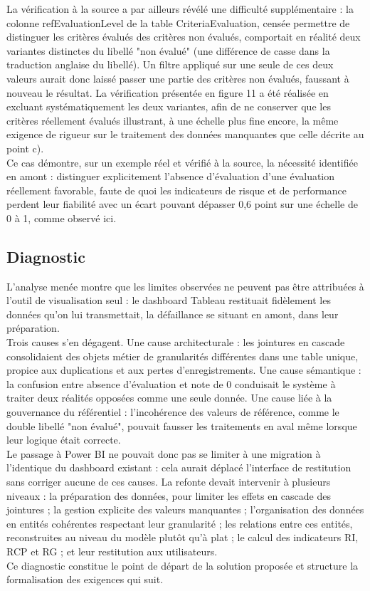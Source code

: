 La vérification à la source a par ailleurs révélé une difficulté supplémentaire : la colonne 
refEvaluationLevel de la table CriteriaEvaluation, censée permettre de distinguer les critères 
évalués des critères non évalués, comportait en réalité deux variantes distinctes du libellé "non 
évalué" (une différence de casse dans la traduction anglaise du libellé). Un filtre appliqué sur 
une seule de ces deux valeurs aurait donc laissé passer une partie des critères non évalués, 
faussant à nouveau le résultat. La vérification présentée en figure 11 a été réalisée en excluant 
systématiquement les deux variantes, afin de ne conserver que les critères réellement évalués 
illustrant, à une échelle plus fine encore, la même exigence de rigueur sur le traitement des 
données manquantes que celle décrite au point c).\\
Ce cas démontre, sur un exemple réel et vérifié à la source, la nécessité identifiée en 
amont : distinguer explicitement l'absence d'évaluation d'une évaluation réellement favorable, 
faute de quoi les indicateurs de risque et de performance perdent leur fiabilité avec un écart 
pouvant dépasser 0,6 point sur une échelle de 0 à 1, comme observé ici.

\subsection{Diagnostic}
L'analyse menée montre que les limites observées ne peuvent pas être attribuées à l'outil 
de visualisation seul : le dashboard Tableau restituait fidèlement les données qu'on lui 
transmettait, la défaillance se situant en amont, dans leur préparation.
\\
Trois causes s'en dégagent. Une cause architecturale : les jointures en cascade 
consolidaient des objets métier de granularités différentes dans une table unique, propice aux 
duplications et aux pertes d'enregistrements. Une cause sémantique : la confusion entre 
absence d'évaluation et note de 0 conduisait le système à traiter deux réalités opposées 
comme une seule donnée. Une cause liée à la gouvernance du référentiel : l'incohérence des 
valeurs de référence, comme le double libellé "non évalué", pouvait fausser les traitements en 
aval même lorsque leur logique était correcte.
\\
Le passage à Power BI ne pouvait donc pas se limiter à une migration à l'identique du 
dashboard existant : cela aurait déplacé l'interface de restitution sans corriger aucune de ces 
causes. La refonte devait intervenir à plusieurs niveaux : la préparation des données, pour 
limiter les effets en cascade des jointures ; la gestion explicite des valeurs manquantes ; 
l'organisation des données en entités cohérentes respectant leur granularité ; les relations 
entre ces entités, reconstruites au niveau du modèle plutôt qu'à plat ; le calcul des indicateurs 
RI, RCP et RG ; et leur restitution aux utilisateurs.
\\
Ce diagnostic constitue le point de départ de la solution proposée et structure la formalisation des exigences qui suit. 

